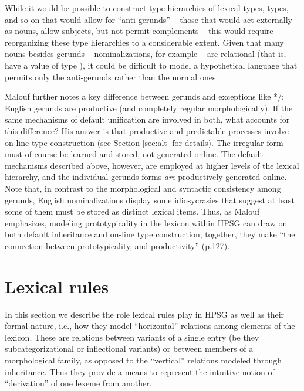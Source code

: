 \documentclass[output=paper]{langsci/langscibook}
\begin{document}
While it would be possible to construct type hierarchies of lexical types,  types, and so on that would allow for ``anti-gerunds'' -- those that would act externally as nouns, allow subjects, but not permit complements -- this would require reorganizing these type hierarchies to a considerable extent.
Given that many nouns besides gerunds -- nominalizations, for example -- are relational (that is, have a  value of type ), it could be difficult to model a hypothetical language that permits only the anti-gerunds rather than the normal ones.

Malouf further notes a key difference between gerunds and exceptions like */: English gerunds are productive (and completely regular morphologically).
If the same mechanisms of default unification are involved in both, what accounts for this difference?
His answer is that productive and predictable processes involve on-line type construction (see Section \ref{sec:alt} for details).
The irregular form  must of course be learned and stored, not generated online.
The default mechanisms described above, however, are employed at higher levels of the lexical hierarchy, and the individual gerunds forms \emph{are} productively generated online.
Note that, in contrast to the morphological and syntactic consistency among gerunds, English nominalizations display some idiosycrasies that suggest at least some of them must be stored as distinct lexical items.
Thus, as Malouf emphasizes, modeling prototypicality in the lexicon within HPSG can draw on both default inheritance and on-line type construction; together, they make ``the connection between prototypicality, and productivity'' (p.127).


\section{Lexical rules}
\label{lexicon-sec-lexical-rules}

In this section we describe the role lexical rules play in HPSG as well as their formal nature, i.e., how they model ``horizontal'' relations among elements of the lexicon. These are relations between variants of a single entry (be they subcategorizational or inflectional variants) or between members of a morphological family, as opposed to the ``vertical'' relations modeled through inheritance. Thus they provide a means to represent the intuitive notion of ``derivation'' of one lexeme from another. 
\end{document}

